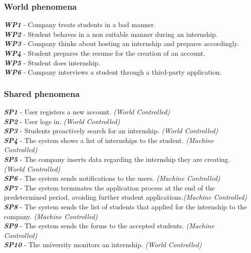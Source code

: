 \documentclass[11pt,twoside]{article}
\begin{document}
		\subsubsection{World phenomena}
\begin{spacing}{1.5}
\textbf{\textit{WP1}} - Company treats students in a bad manner. \\
\textbf{\textit{WP2}} - Student behaves in a non suitable manner during an internship. \\
\textbf{\textit{WP3}} - Company thinks about hosting an internship and prepares accordingly. \\
\textbf{\textit{WP4}} - Student prepares the resume for the creation of an account. \\
\textbf{\textit{WP5}} - Student does internship. \\
\textbf{\textit{WP6}} - Company interviews a student through a third-party application.
\end{spacing}
		\subsubsection{Shared phenomena}
\begin{spacing}{1.5}
\textbf{\textit{SP1}} - User registers a new account. \textit{(World Controlled)} \\
\textbf{\textit{SP2}} - User logs in. \textit{(World Controlled)} \\
\textbf{\textit{SP3}} - Students proactively search for an internship. \textit{(World Controlled)}\\
\textbf{\textit{SP4}} - The system shows a list of internships to the student. \textit{(Machine Controlled)} \\
\textbf{\textit{SP5}} - The company inserts data regarding the internship they are creating. \textit{(World Controlled)} \\
\textbf{\textit{SP6}} - The system sends notifications to the users. \textit{(Machine Controlled)} \\
\textbf{\textit{SP7}} - The system terminates the application process at the end of the predetermined period, avoiding further student applications.\textit{(Machine Controlled)} \\
\textbf{\textit{SP8}} - The system sends the list of students that applied for the internship to the company. \textit{(Machine Controlled)} \\
\textbf{\textit{SP9}} - The system sends the forms to the accepted students. \textit{(Machine Controlled)} \\
\textbf{\textit{SP10}} - The university monitors an internship. \textit{(World Controlled)}
\end{spacing}
\end{document}
